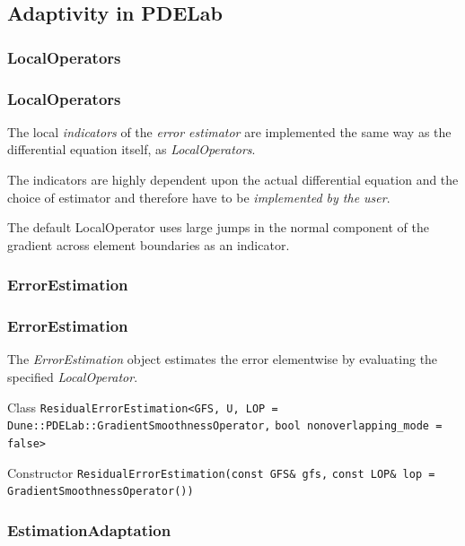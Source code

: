 \subsection{Adaptivity in PDELab}

\subsubsection*{LocalOperators}

\begin{frame}
  \frametitle<presentation>{LocalOperators}
  The local \emph{indicators} of the \emph{error estimator} are implemented the same way as the differential equation itself, as \emph{LocalOperators}.

  The indicators are highly dependent upon the actual differential equation and the choice of estimator and therefore have to be \emph{implemented by the user}.

  The default LocalOperator uses large jumps in the normal component of the gradient across element boundaries as an indicator.

\end{frame}

\subsubsection*{ErrorEstimation}

\begin{frame}[fragile]
  \frametitle<presentation>{ErrorEstimation}
  The \emph{ErrorEstimation} object estimates the error elementwise by evaluating the specified \emph{LocalOperator}.

  \pause

  \begin{block}{Class}
    \lstinline{ResidualErrorEstimation<GFS, U, LOP =}
    \lstinline{Dune::PDELab::GradientSmoothnessOperator,}
    \lstinline{bool nonoverlapping_mode = false>}
  \end{block}

  \pause

  \begin{block}{Constructor}
    \lstinline{ResidualErrorEstimation(const GFS& gfs,}
    \lstinline{const LOP& lop = GradientSmoothnessOperator())}
  \end{block}
\end{frame}

\subsubsection*{EstimationAdaptation}

